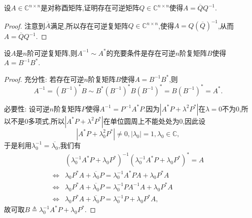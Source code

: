 \documentclass[../../main.tex]{subfiles}
\begin{document}
\begin{proposition}
设\( A \in \mathbb{C}^{n \times n} \)是对称酉矩阵,证明存在可逆矩阵\( Q \in \mathbb{C}^{n \times n} \)使得\( A = \overline{Q} Q^{-1} \).
\end{proposition}
\begin{proof}
注意到\( \overline{A} \)满足,所以存在可逆复矩阵\( Q \in \mathbb{C}^{n \times n} \),使得\( A = Q (\overline{Q})^{-1} \),从而\( A = \overline{Q} Q^{-1} \).

\end{proof}

\begin{theorem}[]\label{theorem:}
设\( A \)是\( n \)阶可逆复矩阵,则\( A^{-1} \sim A^* \)的充要条件是存在可逆\( n \)阶复矩阵\( B \)使得\( A = B^{-1} B^* \).
\end{theorem}
\begin{proof}
{\heiti 充分性:} 若存在可逆\( n \)阶复矩阵\( B \)使得\( A = B^{-1} B^* \),则
\[
A^{-1} = (B^{-1})^* B \sim B^* (B^{-1})^* B (B^{-1})^* = B (B^{-1})^* = A^*.
\]

{\heiti 必要性:} 设可逆\( n \)阶复矩阵\( P \)使得\( A^{-1} = P^{-1} A^* P \).因为\( |A^* P + \lambda^2 P^*| \)在\( \lambda = 0 \)不为0,所以不是0多项式,所以\( |A^* P + \lambda^2 P^*| \)在单位圆周上不能处处为0,因此设
\[
|A^* P + \lambda_0^2 P^*| \neq 0, |\lambda_0| = 1, \lambda_0 \in \mathbb{C},
\]
于是利用\( \lambda_0^{-1} = \overline{\lambda_0} \),我们有
\[
\begin{aligned}
& (\lambda_0^{-1} A^* P + \lambda_0 P^*)^{-1} (\lambda_0^{-1} A^* P + \lambda_0 P^*)^* = A \\
\Leftrightarrow & \lambda_0 P^* A + \overline{\lambda_0} P = \lambda_0^{-1} A^* P A + \lambda_0 P^* A \\
\Leftrightarrow & \lambda_0 P^* A + \overline{\lambda_0} P = \lambda_0^{-1} P A^{-1} A + \lambda_0 P^* A \\
\Leftrightarrow & \lambda_0 P^* A + \overline{\lambda_0} P = \lambda_0^{-1} P + \lambda_0 P^* A,
\end{aligned}
\]
故可取\( B \triangleq \lambda_0^{-1} A^* P + \lambda_0 P^* \).

\end{proof}
\end{document}
